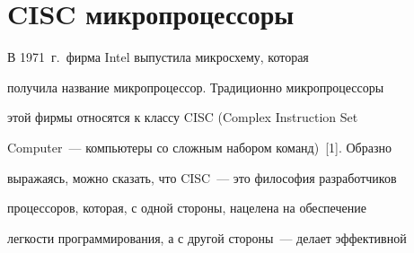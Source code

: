 \vspace*{-1pt}


















      \thispagestyle{headings}





      


            \label{st\stat}


            


            \vspace*{-14pt}





\vspace*{-2pt}


       


               \section{CISC микропроцессоры}





\vspace*{-1pt}





 В 1971~г.\ фирма Intel выпустила микросхему, которая 


получила название микропроцессор.  Традиционно микропроцессоры 


этой фирмы относятся к классу CISC (Complex Instruction Set 


Computer~--- компьютеры со сложным набором команд)~[1]. Образно 


выражаясь, можно сказать, что CISC~--- это философия разработчиков 


процессоров, которая, с одной стороны, нацелена на обеспечение 


легкости программирования, а с другой стороны~---  делает эффективной 


